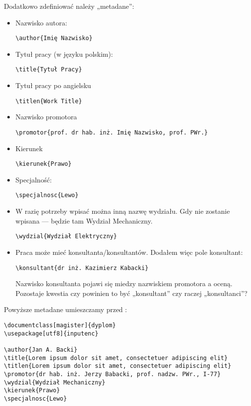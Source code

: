 \begin{enumerate}
Dodatkowo zdefiniować należy „metadane”:
\begin{itemize}
\item
Nazwisko autora:
\begin{verbatim}
\author{Imię Nazwisko}
\end{verbatim}
\item
Tytuł pracy (w języku polskim):
\begin{verbatim}
\title{Tytuł Pracy}
\end{verbatim}
\item
Tytuł pracy po angielsku
\begin{verbatim}
\titlen{Work Title}
\end{verbatim}
\item
Nazwisko promotora
\begin{verbatim}
\promotor{prof. dr hab. inż. Imię Nazwisko, prof. PWr.}
\end{verbatim}
\item
Kierunek
\begin{verbatim}
\kierunek{Prawo}
\end{verbatim}
\item
Specjalność:
\begin{verbatim}
\specjalnosc{Lewo}
\end{verbatim}
\item
W razię potrzeby wpisać można inną nazwę wydziału. Gdy nie zostanie wpisana — będzie tam Wydział Mechaniczny.
\begin{verbatim}
\wydzial{Wydział Elektryczny}
\end{verbatim}
\item
Praca może mieć konsultanta/konsultantów. Dodałem więc pole konsultant:
\begin{verbatim}
\konsultant{dr inż. Kazimierz Kabacki}
\end{verbatim}
Nazwisko konsultanta pojawi się miedzy nazwiskiem promotora a oceną. Pozostaje kwestia czy powinien to być „konsultant” czy raczej „konsultanci”?
\end{itemize}
Powyższe metadane umieszczamy przed \verb||:
\begin{verbatim}
\documentclass[magister]{dyplom}
\usepackage[utf8]{inputenc}

\author{Jan A. Backi}
\title{Lorem ipsum dolor sit amet, consectetuer adipiscing elit}
\titlen{Lorem ipsum dolor sit amet, consectetuer adipiscing elit}
\promotor{dr hab. inż. Jerzy Babacki, prof. nadzw. PWr., I-77}
\wydzial{Wydział Mechaniczny}
\kierunek{Prawo}
\specjalnosc{Lewo}



\end{verbatim}
\end{enumerate}
